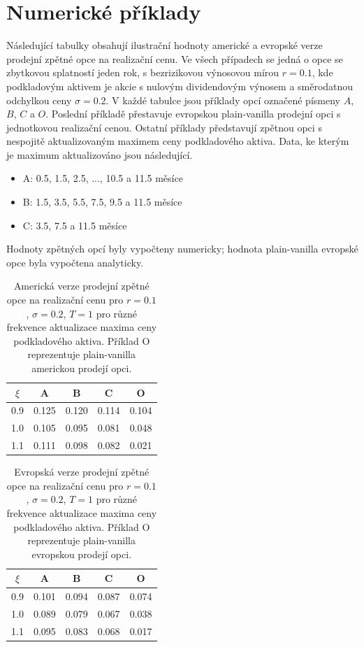 \documentclass[a4paper]{book}
\begin{document}
\section{Numerické příklady}

Následující tabulky obsahují ilustrační hodnoty americké a evropské verze prodejní zpětné opce na realizační cenu. Ve všech případech se jedná o opce se zbytkovou splatností jeden rok, s bezrizikovou výnosovou mírou $r = 0.1$, kde podkladovým aktivem je akcie s nulovým dividendovým výnosem a směrodatnou odchylkou ceny $\sigma = 0.2$. V každé tabulce jsou příklady opcí označené písmeny $A$, $B$, $C$ a $O$. Poslední příkladě přestavuje evropskou plain-vanilla prodejní opci s jednotkovou realizační cenou. Ostatní příklady představují zpětnou opci s nespojitě aktualizovaným maximem ceny podkladového aktiva. Data, ke kterým je maximum aktualizováno jsou následující.
\begin{itemize}
\item A: 0.5, 1.5, 2.5, ..., 10.5 a 11.5 měsíce
\item B: 1.5, 3.5, 5.5, 7.5, 9.5 a 11.5 měsíce
\item C: 3.5, 7.5 a 11.5 měsíce
\end{itemize}
Hodnoty zpětných opcí byly vypočteny numericky; hodnota plain-vanilla evropské opce byla vypočtena analyticky.
\begin{table}
\begin{center}
\begin{tabular}{c c c c c}
$\xi$ & A & B & C & O\\
\hline
 0.9 & 0.125 & 0.120 & 0.114 & 0.104\\
 1.0 & 0.105 & 0.095 & 0.081 & 0.048\\
 1.1 & 0.111 & 0.098 & 0.082 & 0.021\\
\hline
\end{tabular}
\end{center}
\caption{Americká verze prodejní zpětné opce na realizační cenu pro $r = 0.1$, $\sigma = 0.2$, $T = 1$ pro různé frekvence aktualizace maxima ceny podkladového aktiva. Příklad O reprezentuje plain-vanilla americkou prodejí opci.}
\end{table}
\begin{table}
\begin{center}
\begin{tabular}{c c c c c}
$\xi$ & A & B & C & O\\
\hline
 0.9 & 0.101 & 0.094 & 0.087 & 0.074\\
 1.0 & 0.089 & 0.079 & 0.067 & 0.038\\
 1.1 & 0.095 & 0.083 & 0.068 & 0.017\\
\hline
\end{tabular}
\end{center}
\caption{Evropská verze prodejní zpětné opce na realizační cenu pro $r = 0.1$, $\sigma = 0.2$, $T = 1$ pro různé frekvence aktualizace maxima ceny podkladového aktiva. Příklad O reprezentuje plain-vanilla evropskou prodejí opci.}
\end{table}
\end{document}

